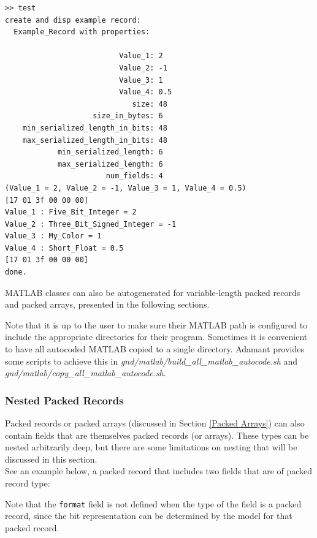 \vspace{5mm} %
\begin{verbatim}
>> test
create and disp example record:
  Example_Record with properties:

                          Value_1: 2
                          Value_2: -1
                          Value_3: 1
                          Value_4: 0.5
                             size: 48
                    size_in_bytes: 6
    min_serialized_length_in_bits: 48
    max_serialized_length_in_bits: 48
            min_serialized_length: 6
            max_serialized_length: 6
                       num_fields: 4
(Value_1 = 2, Value_2 = -1, Value_3 = 1, Value_4 = 0.5)
[17 01 3f 00 00 00]
Value_1 : Five_Bit_Integer = 2
Value_2 : Three_Bit_Signed_Integer = -1
Value_3 : My_Color = 1
Value_4 : Short_Float = 0.5
[17 01 3f 00 00 00]
done.
\end{verbatim}
\vspace{5mm} %

MATLAB classes can also be autogenerated for variable-length packed records and packed arrays, presented in the following sections.

Note that it is up to the user to make sure their MATLAB path is configured to include the appropriate directories for their program. Sometimes it is convenient to have all autocoded MATLAB copied to a single directory. Adamant provides some scripts to achieve this in \textit{gnd/matlab/build\_all\_matlab\_autocode.sh} and \textit{gnd/matlab/copy\_all\_matlab\_autocode.sh}.

\subsubsection{Nested Packed Records} \label{Nested Packed Records}

Packed records or packed arrays (discussed in Section \ref{Packed Arrays}) can also contain fields that are themselves packed records (or arrays). These types can be nested arbitrarily deep, but there are some limitations on nesting that will be discussed in this section. \\

See an example below, a packed record that includes two fields that are of packed record type:


Note that the \texttt{format} field is not defined when the type of the field is a packed record, since the bit representation can be determined by the model for that packed record. \\

